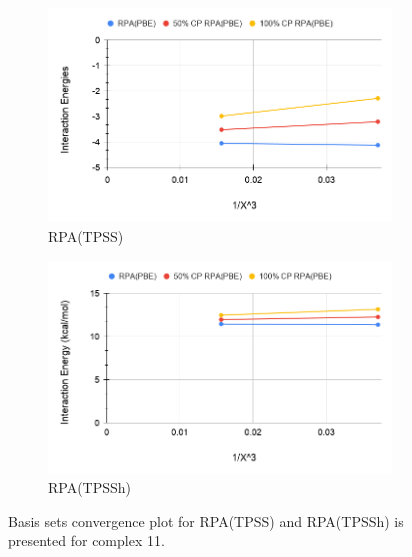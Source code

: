 \documentclass[11pt]{article}
\begin{document}
\begin{figure}[hbpt]
  \centering
  \begin{subfigure}{.5\textwidth}
    \center
    \includegraphics[scale=0.3]{tpss_11.png}
    \caption{RPA(TPSS)}
    \label{fig:tpss11}
  \end{subfigure}%
  \begin{subfigure}{.5\textwidth}
    \center
    \includegraphics[scale=0.3]{tpssh_11.png}
    \caption{RPA(TPSSh)}
    \label{fig:tpssh_11}
  \end{subfigure}
  \caption{Basis sets convergence plot for RPA(TPSS) and RPA(TPSSh) is
    presented for complex 11.}
  \label{fig:complex_11}
\end{figure}
\end{document}
